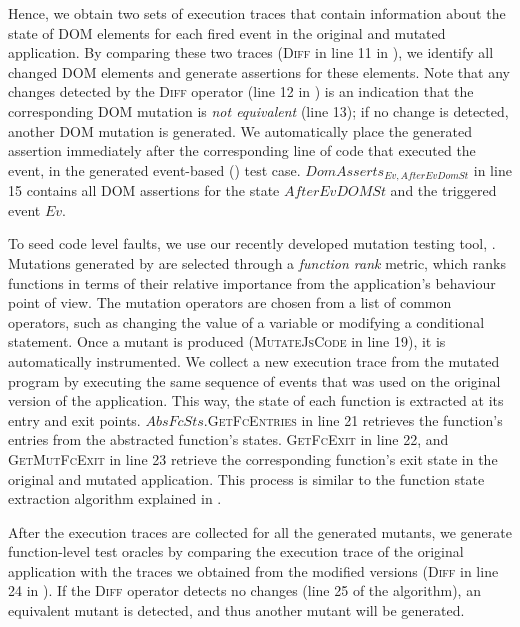 Hence, we obtain two sets of execution traces that contain information about the state of DOM elements for each fired event in the original and mutated application. By comparing these two traces (\textsc{Diff} in line 11 in ), we identify all changed DOM elements and generate assertions for these elements. 
Note that  any changes detected by the \textsc{Diff} operator (line 12 in ) is an indication that the corresponding DOM mutation is \emph{not equivalent} (line 13); if no change is detected, another DOM mutation is generated. 
We automatically place the generated assertion immediately after the corresponding line of code that executed the event, in the generated event-based (\selenium) test case. $DomAsserts_{Ev,AfterEvDomSt}$ in line 15 contains all DOM assertions for the state $AfterEvDOMSt$ and the triggered event $Ev$.
  
 To seed code level faults, we use our recently developed \javascript mutation testing tool, \mutandis \cite{mirshokraie:icst13}. Mutations generated by \mutandis are selected through a \emph{function rank} metric, which ranks functions in terms of their relative importance from the application's behaviour point of view. 
The mutation operators are chosen from a list of common operators, such as changing the value of a variable or modifying a conditional statement. 
Once a mutant is produced (\textsc{MutateJsCode} in line 19), it is automatically instrumented.
We collect a new execution trace from the mutated  program by executing the same sequence of events that was used on the original version of the application. This way, the state of each \javascript function is extracted at its entry and exit points. $AbsFcSts.$\textsc{GetFcEntries} in line 21 retrieves the function's entries from the abstracted function's states. \textsc{GetFcExit} in line 22, and \textsc{GetMutFcExit} in line 23 retrieve the corresponding function's exit state in the original and mutated application. This process is similar to the function state extraction algorithm explained in .

After the execution traces are collected for all the generated mutants, we generate function-level test oracles by comparing the execution trace of the original application with the traces we obtained from the modified versions (\textsc{Diff} in line 24 in ). 
If the \textsc{Diff} operator detects no changes (line 25 of the algorithm), an equivalent mutant is detected, and thus another mutant will be generated. 

